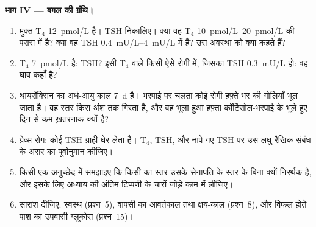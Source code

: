 \begin{problem}
\medskip
\noindent\textbf{भाग IV --- बगल की ग्रंथि।}
\begin{enumerate}[resume]
  \item मुक्त T$_{4}$ \qty{12}{pmol/L} है। TSH निकालिए। क्या वह
        T$_{4}$ \qtyrange{10}{20}{pmol/L} की परास में है? क्या वह TSH
        \qtyrange{0.4}{4}{mU/L} में है? उस अवस्था को क्या कहते हैं?
  \item T$_{4}$ \qty{7}{pmol/L} है: TSH? इसी T$_{4}$ वाले किसी ऐसे रोगी
        में, जिसका TSH \qty{0.3}{mU/L} हो: वह घाव कहाँ है?
  \item थायरॉक्सिन का अर्ध-आयु काल \qty{7}{d} है। भरपाई पर चलता कोई
        रोगी हफ़्ते भर की गोलियाँ भूल जाता है। वह स्तर किस अंश तक गिरता
        है, और वह भूला हुआ हफ़्ता कॉर्टिसोल-भरपाई के भूले हुए दिन से कम
        ख़तरनाक क्यों है?
  \item ग्रेव्स रोग: कोई  TSH ग्राही घेर लेता है। T$_{4}$,
        TSH, और नापे गए TSH पर उस लघु-रैखिक संबंध के असर का
        पूर्वानुमान कीजिए।
  \item किसी एक अनुच्छेद में समझाइए कि किसी  का स्तर उसके
        सेनापति के स्तर के बिना क्यों निरर्थक है, और इसके लिए अध्याय
        की अंतिम टिप्पणी के चारों जोड़े काम में लीजिए।
  \item सारांश दीजिए: स्वस्थ  (प्रश्न~5), वापसी का आवर्तकाल तथा
        क्षय-काल (प्रश्न~8), और विफल होते पाश का उपवासी ग्लूकोस
        (प्रश्न~15)।
\end{enumerate}
\end{problem}
